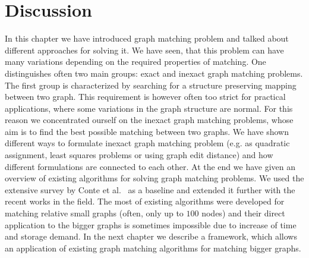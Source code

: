 
\section{Discussion}
In this chapter we have introduced graph matching problem and talked about different approaches for solving it. We have seen, that this problem can have many variations depending on the required properties of matching. One distinguishes often two main groups: exact and inexact graph matching problems. The first group is characterized by searching for a structure preserving mapping between two graph. This requirement is however often too strict for practical applications, where some variations in the graph structure are normal. For this reason we concentrated ourself on the inexact graph matching problems, whose aim is to find the best possible matching between two graphs. We have shown different ways to formulate inexact graph matching problem (e.g. as quadratic assignment, least squares problems or using graph edit distance) and how different formulations are connected to each other. At the end we have given an overview of existing algorithms for solving graph matching problems. We used the extensive survey by Conte et al.~\cite{Conte2004} as a baseline and extended it further with the recent works in the field. The most of existing algorithms were developed for matching relative small graphs (often, only up to $100$ nodes) and their direct application to the bigger graphs is sometimes impossible due to  increase of time and storage demand. %
In the next chapter we describe a framework, which allows an application of existing graph matching algorithms for matching bigger graphs.
